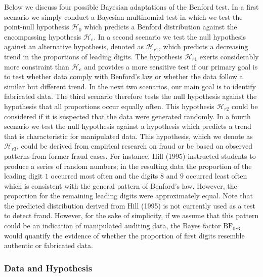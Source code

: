 \documentclass[
  english,
  man,floatsintext]{apa6}
\begin{document}
Below we discuss four possible Bayesian adaptations of the Benford test. In a first scenario we simply conduct a Bayesian multinomial test in which we test the point-null hypothesis \(\mathcal{H}_0\) which predicts a Benford distribution against the encompassing hypothesis \(\mathcal{H}_{e}\). In a second scenario we test the null hypothesis against an alternative hypothesis, denoted as \(\mathcal{H}_{r1}\), which predicts a decreasing trend in the proportions of leading digits. The hypothesis \(\mathcal{H}_{r1}\) exerts considerably more constraint than \(\mathcal{H}_{e}\) and provides a more sensitive test if our primary goal is to test whether data comply with Benford's law or whether the data follow a similar but different trend. In the next two scenarios, our main goal is to identify fabricated data. The third scenario therefore tests the null hypothesis against the hypothesis that all proportions occur equally often. This hypothesis \(\mathcal{H}_{r2}\) could be considered if it is suspected that the data were generated randomly. In a fourth scenario we test the null hypothesis against a hypothesis which predicts a trend that is characteristic for manipulated data. This hypothesis, which we denote as \(\mathcal{H}_{r3}\), could be derived from empirical research on fraud or be based on observed patterns from former fraud cases. For instance, Hill (1995) instructed students to produce a series of random numbers; in the resulting data the proportion of the leading digit \(1\) occurred most often and the digits \(8\) and \(9\) occurred least often which is consistent with the general pattern of Benford's law. However, the proportion for the remaining leading digits were approximately equal. Note that the predicted distribution derived from Hill (1995) is not currently used as a test to detect fraud. However, for the sake of simplicity, if we assume that this pattern could be an indication of manipulated auditing data, the Bayes factor \(\text{BF}_{0r3}\) would quantify the evidence of whether the proportion of first digits resemble authentic or fabricated data.

\hypertarget{data-and-hypothesis}{%
\subsubsection{Data and Hypothesis}\label{data-and-hypothesis}}
\end{document}

